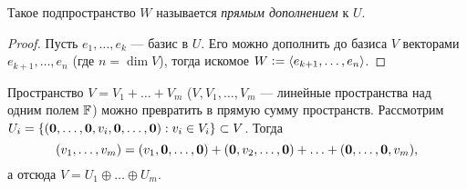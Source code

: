 \begin{definition}
    Такое подпространство $W$ называется \textit{прямым дополнением} к $U$.
\end{definition}

\begin{proof}
    Пусть $e_1, \ldots, e_k$ --- базис в $U$. Его можно дополнить до базиса $V$ векторами $e_{k + 1}, \ldots, e_n$ (где $n = \dim V$), тогда искомое $W \vcentcolon = \langle e_{k + 1}, \ldots, e_n\rangle$.
\end{proof}

\begin{remark}
    Пространство $V = V_1 + \ldots + V_m$ ($V, V_1, \ldots, V_m$ --- линейные пространства над одним полем $\mathbb{F}$) можно превратить в прямую сумму пространств. Рассмотрим $U_i = \{(\boldsymbol{0}, \ldots, \boldsymbol{0}, v_i, \boldsymbol{0}, \ldots, \boldsymbol{0}) : v_i \in V_i\} \subset V$. Тогда
    \[
        (v_1, \ldots, v_m) = (v_1, \boldsymbol{0}, \ldots, \boldsymbol{0}) + (\boldsymbol{0}, v_2, \ldots, \boldsymbol{0}) + \ldots + (\boldsymbol{0}, \ldots, \boldsymbol{0}, v_m),
    \]
    а отсюда $V = U_1 \oplus \ldots \oplus U_m$.
\end{remark}

